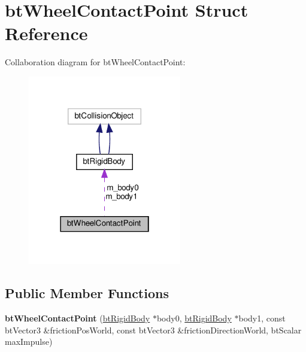 \hypertarget{structbtWheelContactPoint}{}\section{bt\+Wheel\+Contact\+Point Struct Reference}
\label{structbtWheelContactPoint}


Collaboration diagram for bt\+Wheel\+Contact\+Point\+:
\nopagebreak
\begin{figure}[H]
\begin{center}
\leavevmode
\includegraphics[width=190pt]{structbtWheelContactPoint__coll__graph}
\end{center}
\end{figure}
\subsection*{Public Member Functions}
\begin{DoxyCompactItemize}
\item 
\mbox{\label{structbtWheelContactPoint_afb6cf036281d1994930a85f03bf7bba6}} 
{\bfseries bt\+Wheel\+Contact\+Point} (\hyperlink{classbtRigidBody}{bt\+Rigid\+Body} $\ast$body0, \hyperlink{classbtRigidBody}{bt\+Rigid\+Body} $\ast$body1, const bt\+Vector3 \&friction\+Pos\+World, const bt\+Vector3 \&friction\+Direction\+World, bt\+Scalar max\+Impulse)
\end{DoxyCompactItemize}
